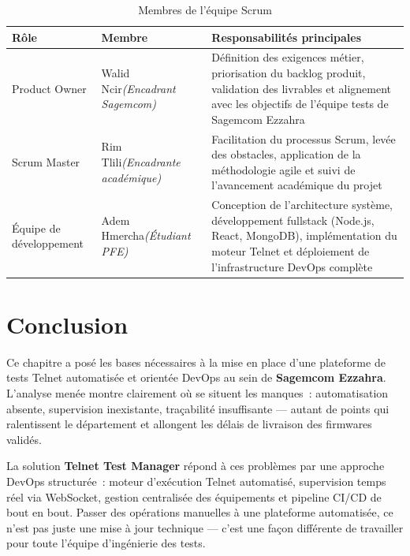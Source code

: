\begin{table}[H]
  \centering
  \caption{Membres de l'équipe Scrum}
  \label{tab:equipe_scrum}
  \begin{tabularx}{\textwidth}{|L{2.8cm}|L{3.5cm}|X|}
    \hline
    \textbf{Rôle} & \textbf{Membre} & \textbf{Responsabilités principales} \\
    \hline
    Product Owner &
      Walid Ncir\newline\textit{(Encadrant Sagemcom)} &
      Définition des exigences métier, priorisation du backlog produit,
      validation des livrables et alignement avec les objectifs de
      l'équipe tests de Sagemcom Ezzahra \\
    \hline
    Scrum Master &
      Rim Tlili\newline\textit{(Encadrante académique)} &
      Facilitation du processus Scrum, levée des obstacles,
      application de la méthodologie agile et suivi de l'avancement
      académique du projet \\
    \hline
    Équipe de développement &
      Adem Hmercha\newline\textit{(Étudiant PFE)} &
      Conception de l'architecture système, développement fullstack
      (Node.js, React, MongoDB), implémentation du moteur Telnet et
      déploiement de l'infrastructure DevOps complète \\
    \hline
  \end{tabularx}
\end{table}

\section{Conclusion}

Ce chapitre a posé les bases nécessaires à la mise en place d'une
plateforme de tests Telnet automatisée et orientée DevOps au sein de
\textbf{Sagemcom Ezzahra}. L'analyse menée montre clairement où se
situent les manques~: automatisation absente, supervision inexistante,
traçabilité insuffisante --- autant de points qui ralentissent le
département et allongent les délais de livraison des firmwares validés.

La solution \textbf{Telnet Test Manager} répond à ces problèmes par
une approche DevOps structurée~: moteur d'exécution Telnet automatisé,
supervision temps réel via WebSocket, gestion centralisée des équipements
et pipeline CI/CD de bout en bout. Passer des opérations manuelles à une
plateforme automatisée, ce n'est pas juste une mise à jour technique ---
c'est une façon différente de travailler pour toute l'équipe d'ingénierie
des tests.


